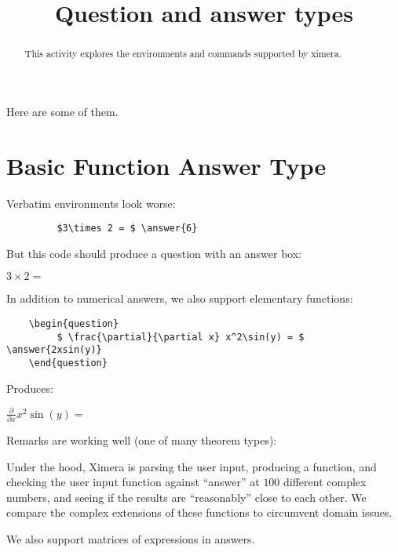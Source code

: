 \documentclass{ximera}
\title{Question and answer types}
\begin{document}
\begin{abstract}
  This activity explores the environments and commands supported by ximera. 
\end{abstract}

\maketitle

Here are some of them.


\section{Basic Function Answer Type}

Verbatim environments look worse:

\begin{verbatim}
         $3\times 2 = $ \answer{6}
\end{verbatim}

But this code should produce a question with an answer box:

\begin{question}
  $3\times 2 = $ 
\end{question}


In addition to numerical answers, we also support elementary functions:

\begin{verbatim}
    \begin{question}
         $ \frac{\partial}{\partial x} x^2\sin(y) = $ \answer{2xsin(y)}
    \end{question}
\end{verbatim}

Produces:

\begin{question}
  $ \frac{\partial}{\partial x} x^2\sin(y) = $ 
\end{question}

Remarks are working well (one of many theorem types):

\begin{remark}
Under the hood, Ximera is parsing the user input, producing a
function, and checking the user input function against ``answer'' at
$100$ different complex numbers, and seeing if the results are
``reasonably'' close to each other.  We compare the complex extensions
of these functions to circumvent domain issues.
\end{remark}

We also support matrices of expressions in answers.
\end{document}
